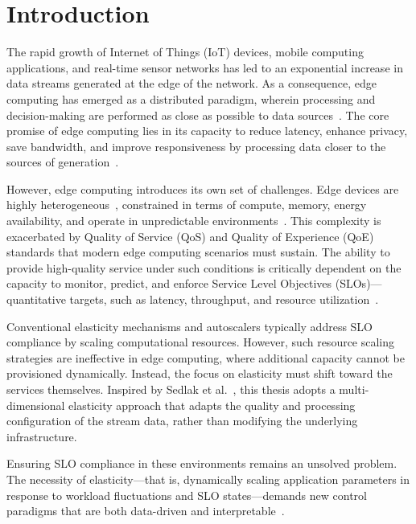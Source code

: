 \chapter{Introduction}

The rapid growth of Internet of Things (IoT) devices, mobile computing applications, and real-time sensor networks has led to an exponential increase in data streams generated at the edge of the network. As a consequence, edge computing has emerged as a distributed paradigm, wherein processing and decision-making are performed as close as possible to data sources~\cite{deng_edge_2020}. The core promise of edge computing lies in its capacity to
reduce latency, enhance privacy, save bandwidth, and improve responsiveness by processing data closer to the sources of generation~\cite{deng_edge_2020}. 

However, edge computing introduces its own set of challenges. Edge devices are highly heterogeneous~\cite{furst_elastic_2018}, constrained in terms of compute, memory, energy availability, and operate in unpredictable environments~\cite{sedlak_active_2024, danilenka_adaptive_2025}. This complexity is exacerbated by Quality of Service (QoS) and Quality of Experience (QoE) standards that modern edge computing scenarios must sustain. The ability to provide high-quality service under such conditions is critically dependent on the capacity to monitor, predict, and enforce Service Level Objectives (SLOs)---quantitative targets, such as latency, throughput, and resource utilization~\cite{sedlak_diffusing_2024, nastic_sloc_2020}. 

Conventional elasticity mechanisms and autoscalers typically address SLO compliance by scaling computational resources. However, such resource scaling strategies are ineffective in edge computing, where additional capacity cannot be provisioned dynamically. Instead, the focus on elasticity must shift toward the services themselves. Inspired by Sedlak et al.~\cite{sedlak_towards_2025}, this thesis adopts a multi-dimensional elasticity approach that adapts the quality and processing configuration of the stream data, rather than modifying the underlying infrastructure.

Ensuring SLO compliance in these environments remains an unsolved problem. The necessity of elasticity---that is, dynamically scaling application parameters in response to workload fluctuations and SLO states---demands new control paradigms that are both data-driven and interpretable~\cite{lapkovskis_benchmarking_2025, dias_de_assuncao_distributed_2018}.

